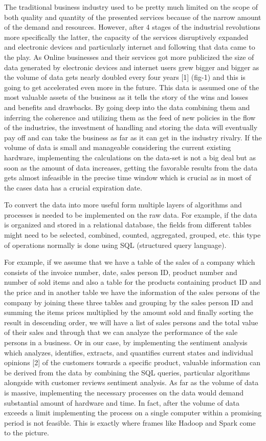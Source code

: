 \noindent
The traditional business industry used to be pretty much limited on the scope of both quality and quantity of the presented services because of the narrow amount of the demand and resources. However, after 4 stages of the industrial revolutions more specifically the latter, the capacity of the services disruptively expanded and electronic devices and particularly internet and following that data came to the play. As Online businesses and their services got more publicized the size of data generated by electronic devices and internet users grew bigger and bigger as the volume of data gets nearly doubled every four years [1] (fig-1) and this is going to get accelerated even more in the future. This data is assumed one of the most valuable assets of the business as it tells the story of the wins and losses and benefits and drawbacks. By going deep into the data combining them and inferring the coherence and utilizing them as the feed of new policies in the flow of the industries, the investment of handling and storing the data will eventually pay off and can take the business as far as it can get in the industry rivalry. If the volume of data is small and manageable considering the current existing hardware, implementing the calculations on the data-set is not a big deal but as soon as the amount of data increases, getting the favorable results from the data gets almost infeasible in the precise time window which is crucial as in most of the cases data has a crucial expiration date.

To convert the data into more useful form multiple layers of algorithms and processes is needed to be implemented on the raw data. For example, if the data is organized and stored in a relational database, the fields from different tables might need to be selected, combined, counted, aggregated, grouped, etc. this type of operations normally is done using SQL (structured query language). 

For example, if we assume that we have a table of the sales of a company which consists of the invoice number, date, sales person ID, product number and number of sold items and also a table for the products containing product ID and the price and in another table we have the information of the sales persons of the company by joining these three tables and grouping by the sales person ID and summing the items prices multiplied by the amount sold and finally sorting the result in descending order, we will have a list of sales persons and the total value of their sales and through that we can analyze the performance of the sale persons in a business. Or in our case, by implementing the sentiment analysis which analyzes, identifies, extracts, and quantifies current states and individual opinions [2] of the customers towards a specific product, valuable information can be derived from the data by combining the SQL queries, particular algorithms alongside with customer reviews sentiment analysis. As far as the volume of data is massive, implementing the necessary processes on the data would demand substantial amount of hardware and time. In fact, after the volume of data exceeds a limit implementing the process on a single computer within a promising period is not feasible. This is exactly where frames like Hadoop and Spark come to the picture.